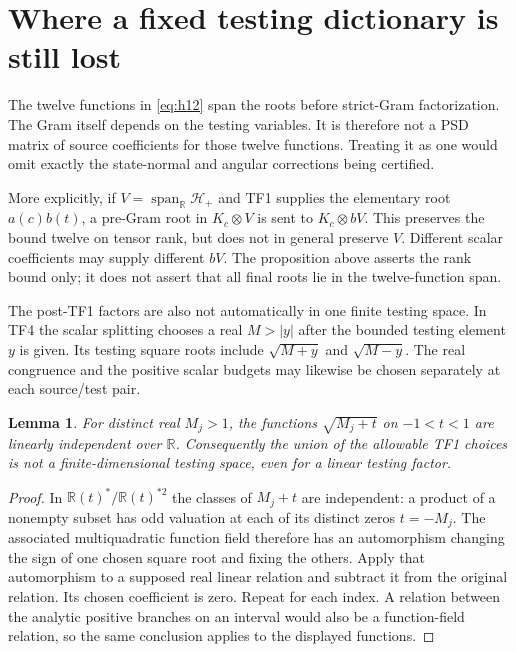 \documentclass[11pt]{article}
\newtheorem{lemma}[proposition]{Lemma}
\newcommand{\R}{\mathbb R}
\begin{document}
\section{Where a fixed testing dictionary is still lost}

The twelve functions in \eqref{eq:h12} span the roots before
strict-Gram factorization. The Gram itself depends on the testing
variables. It is therefore not a PSD matrix of source coefficients
for those twelve functions. Treating it as one would omit exactly
the state-normal and angular corrections being certified.

More explicitly, if $V=\operatorname{span}_{\R}\mathcal H_+$ and
TF1 supplies the elementary root $a(c)b(t)$, a pre-Gram root in
$K_c\otimes V$ is sent to $K_c\otimes bV$. This preserves the
bound twelve on tensor rank, but does not in general preserve
$V$. Different scalar coefficients may supply different $bV$.
The proposition above asserts the rank bound only; it does not
assert that all final roots lie in the twelve-function span.

The post-TF1 factors are also not automatically in one finite
testing space. In TF4 the scalar splitting chooses a real
$M>|y|$ after the bounded testing element $y$ is given. Its
testing square roots include $\sqrt{M+y}$ and $\sqrt{M-y}$.
The real congruence and the positive scalar budgets may likewise
be chosen separately at each source/test pair.

\begin{lemma}\label{lem:independence}
For distinct real $M_j>1$, the functions
$\sqrt{M_j+t}$ on $-1<t<1$ are linearly independent over $\R$.
Consequently the union of the allowable TF1 choices is not a
finite-dimensional testing space, even for a linear testing factor.
\end{lemma}
\begin{proof}
In $\R(t)^*/\R(t)^{*2}$ the classes of $M_j+t$ are independent:
a product of a nonempty subset has odd valuation at each of its
distinct zeros $t=-M_j$. The associated multiquadratic function
field therefore has an automorphism changing the sign of one
chosen square root and fixing the others. Apply that automorphism
to a supposed real linear relation and subtract it from the
original relation. Its chosen coefficient is zero. Repeat for
each index. A relation between the analytic positive branches on
an interval would also be a function-field relation, so the same
conclusion applies to the displayed functions.
\end{proof}
\end{document}
